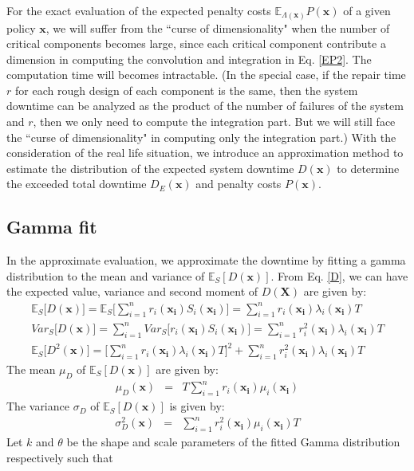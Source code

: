 \documentclass[preprint,12pt]{elsarticle}
\begin{document}
For the exact evaluation of the expected penalty costs $\mathbb{E}_{\Lambda(\boldsymbol{x})}P(\boldsymbol{x})$ of a given policy $\boldsymbol{x}$, we will suffer from the ``curse of dimensionality" when the number of critical components becomes large, since each critical component contribute a dimension in computing the convolution and integration in Eq. \eqref{EP2}. The computation time will becomes intractable. (In the special case, if the repair time $r$ for each rough design of each component is the same, then the system downtime can be analyzed as the product of the number of failures of the system and $r$, then we only need to compute the integration part. But we will still face the ``curse of dimensionality" in computing only the integration part.) With the consideration of the real life situation, we introduce an approximation method to estimate the distribution of the expected system downtime $D(\boldsymbol{x})$ to determine the exceeded total downtime $D_{E}(\boldsymbol{x})$ and penalty costs $P(\boldsymbol{x})$.
\subsection{Gamma fit}

In the approximate evaluation, we approximate the downtime by fitting a gamma distribution to the mean and variance of $\mathbb{E}_{S}[D(\boldsymbol{x})]$. From Eq. \eqref{D}, we can have the expected value, variance and second moment of $D(\boldsymbol{X})$ are given by:
\begin{eqnarray}
\mathbb{E}_{S}\bigg[D(\boldsymbol{x})\bigg]=\mathbb{E}_{S}\bigg[\sum_{i=1}^{n}{r_{i}(\boldsymbol{x_{i}})S_{i}(\boldsymbol{x_{i}})}\bigg]=\sum_{i=1}^{n}{r_{i}(\boldsymbol{x_{i}})\lambda_{i}(\boldsymbol{x_{i}})T}
\label{ED1}\\
Var_{S}\bigg[D(\boldsymbol{x})\bigg]=\sum_{i=1}^{n}{Var_{S}\bigg[{r_{i}(\boldsymbol{x_{i}})S_{i}(\boldsymbol{x_{i}})}\bigg]}=\sum_{i=1}^{n}{r_{i}^{2}(\boldsymbol{x_{i}})\lambda_{i}(\boldsymbol{x_{i}})T}
\label{VD1}\\
\mathbb{E}_{S}\bigg[D^{2}(\boldsymbol{x}) \bigg]= \bigg[\sum_{i=1}^{n}{r_{i}(\boldsymbol{x_{i}})\lambda_{i}(\boldsymbol{x_{i}})T}\bigg]^{2} + \sum_{i=1}^{n}{r_{i}^{2}(\boldsymbol{x_{i}})\lambda_{i}(\boldsymbol{x_{i}})T}
\end{eqnarray}
The mean $\mu_{D}$ of $\mathbb{E}_{S}[D(\boldsymbol{x})]$ are given by:
\begin{eqnarray}
\mu_{D}(\boldsymbol{x})&=&T\sum_{i=1}^{n}{r_{i}(\boldsymbol{x_i})\mu_{i}(\boldsymbol{x_i})}
\label{muD}
\end{eqnarray}
The variance $\sigma_{D}$ of $\mathbb{E}_{S}[D(\boldsymbol{x})]$ is given by:
\begin{eqnarray}
\sigma^{2}_{D}(\boldsymbol{x})&=&\sum_{i=1}^{n}{r_{i}^{2}(\boldsymbol{x_i})\mu_{i}(\boldsymbol{x_i})T}
\end{eqnarray}
Let $k$ and $\theta$ be the shape and scale parameters of the fitted Gamma distribution respectively such that
\end{document}
